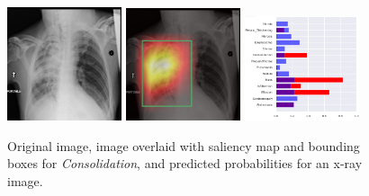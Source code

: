 \documentclass[12pt,oneside,a4paper]{report}
\begin{document}
\begin{figure}[H]
  \centering
  \includegraphics[width=0.3\textwidth]{images/preds/consolidation}\hspace{0.01\textwidth}%
  \includegraphics[width=0.3\textwidth]{images/preds/consolidation_cam}\hspace{0.01\textwidth}%
  \includegraphics[width=0.3\textwidth]{images/preds/consolidation_probs}\\[0.01\textwidth]
  \caption{Original image, image overlaid with saliency map and bounding boxes
    for \emph{Consolidation}, and predicted probabilities for an x-ray image.}
  \label{examples_9}
\end{figure}
\end{document}
